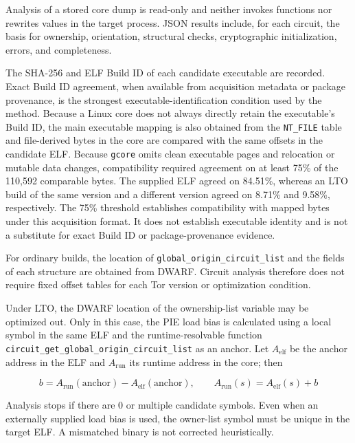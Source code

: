 \documentclass[10pt,a4paper]{article}
\newcommand{\code}[1]{\nolinkurl{#1}}
\begin{document}
Analysis of a stored core dump is read-only and neither invokes functions nor rewrites values in the target process. JSON results include, for each circuit, the basis for ownership, orientation, structural checks, cryptographic initialization, errors, and completeness.


The SHA-256 and ELF Build ID of each candidate executable are recorded. Exact Build ID agreement, when available from acquisition metadata or package provenance, is the strongest executable-identification condition used by the method. Because a Linux core does not always directly retain the executable's Build ID, the main executable mapping is also obtained from the \code{NT_FILE} table and file-derived bytes in the core are compared with the same offsets in the candidate ELF. Because \code{gcore} omits clean executable pages and relocation or mutable data changes, compatibility required agreement on at least 75\% of the 110,592 comparable bytes. The supplied ELF agreed on 84.51\%, whereas an LTO build of the same version and a different version agreed on 8.71\% and 9.58\%, respectively. The 75\% threshold establishes compatibility with mapped bytes under this acquisition format. It does not establish executable identity and is not a substitute for exact Build ID or package-provenance evidence.

For ordinary builds, the location of \code{global_origin_circuit_list} and the fields of each structure are obtained from DWARF. Circuit analysis therefore does not require fixed offset tables for each Tor version or optimization condition.

Under LTO, the DWARF location of the ownership-list variable may be optimized out. Only in this case, the PIE load bias is calculated using a local symbol in the same ELF and the runtime-resolvable function \code{circuit_get_global_origin_circuit_list} as an anchor. Let $A_{\mathrm{elf}}$ be the anchor address in the ELF and $A_{\mathrm{run}}$ its runtime address in the core; then

\begin{equation}
 b=A_{\mathrm{run}}(\mathrm{anchor})-A_{\mathrm{elf}}(\mathrm{anchor}),\qquad
 A_{\mathrm{run}}(s)=A_{\mathrm{elf}}(s)+b
\end{equation}

Analysis stops if there are 0 or multiple candidate symbols. Even when an externally supplied load bias is used, the owner-list symbol must be unique in the target ELF. A mismatched binary is not corrected heuristically.
\end{document}
